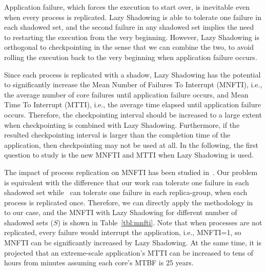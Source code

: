 Application failure, which forces the execution to start over, is inevitable even when every process is replicated. Lazy Shadowing is able to 
tolerate one failure in each shadowed set, and the second failure in any shadowed set implies the need to restarting the execution from the very beginning. However, Lazy Shadowing is orthogonal to checkpointing in 
the sense that we can combine the two, to avoid rolling the execution back to the very beginning when application failure occurs.

Since each process is replicated with a shadow, Lazy Shadowing has the potential to significantly 
increase the Mean Number of Failures To Interrupt (MNFTI), i.e., the average number of core failures until application failure occurs, and Mean Time To Interrupt (MTTI), i.e., the average time elapsed until application failure occurs. 
Therefore, the checkpointing interval should be increased to a large extent when checkpointing is combined with Lazy Shadowing. Furthermore, if the resulted checkpointing interval is 
larger than the completion time of the application, then checkpointing may not be used at
all. 
In the following, the first question to study is the new MNFTI and MTTI when Lazy Shadowing is used. 


The impact of process replication on MNFTI has been studied in~\cite{casanova_inria_2012}. Our problem
is equivalent with the difference that our work can tolerate one failure in each shadowed 
set while~\cite{casanova_inria_2012} can tolerate one failure in each replica-group, when each process
is replicated once. 
Therefore, we can directly apply the methodology in~\cite{casanova_inria_2012} to our case, and the MNFTI
with Lazy Shadowing for different number of shadowed sets ($S$) is shown in Table~\ref{tbl:mnfti}. 
Note that when processes are not replicated, every failure would interrupt the application, i.e., MNFTI=1, so MNFTI can be significantly increased by Lazy Shadowing. 
At the same time, it is projected that an extreme-scale application's MTTI can be increased to tens of hours from minutes assuming each core's MTBF is 25 years.

